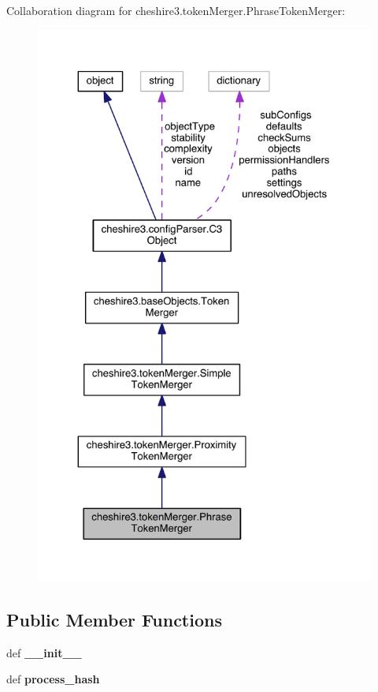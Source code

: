 Collaboration diagram for cheshire3.\-token\-Merger.\-Phrase\-Token\-Merger\-:
\nopagebreak
\begin{figure}[H]
\begin{center}
\leavevmode
\includegraphics[width=325pt]{classcheshire3_1_1token_merger_1_1_phrase_token_merger__coll__graph}
\end{center}
\end{figure}
\subsection*{Public Member Functions}
\begin{DoxyCompactItemize}
\item 
\hypertarget{classcheshire3_1_1token_merger_1_1_phrase_token_merger_a926fcdfe994c000d7733980938c82566}{def {\bfseries \-\_\-\-\_\-init\-\_\-\-\_\-}}\label{classcheshire3_1_1token_merger_1_1_phrase_token_merger_a926fcdfe994c000d7733980938c82566}

\item 
\hypertarget{classcheshire3_1_1token_merger_1_1_phrase_token_merger_ae1a439f1b7fcc86e5311b40747b6331d}{def {\bfseries process\-\_\-hash}}\label{classcheshire3_1_1token_merger_1_1_phrase_token_merger_ae1a439f1b7fcc86e5311b40747b6331d}

\end{DoxyCompactItemize}
